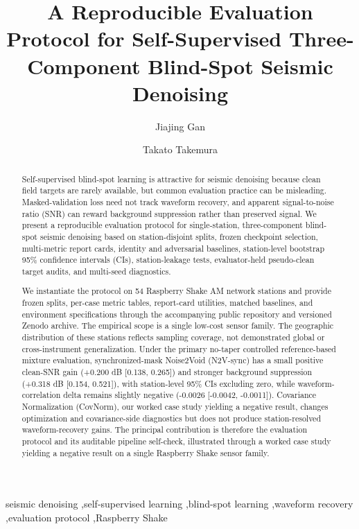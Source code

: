 \documentclass[review,12pt,authoryear]{elsarticle}
\begin{document}
\begin{frontmatter}

\title{A Reproducible Evaluation Protocol for Self-Supervised Three-Component Blind-Spot Seismic Denoising}

\author[aff1]{Jiajing Gan}

\author[aff1]{Takato Takemura}


\address[aff1]{Geomechanics Laboratory, Department of Earth and Environmental Sciences, College of Humanities and Sciences, Nihon University, 3-25-40 Sakurajosui, Setagaya-ku, Tokyo 156-8550, Japan}

\begin{abstract}
Self-supervised blind-spot learning is attractive for seismic denoising because clean field targets are rarely available, but common evaluation practice can be misleading. Masked-validation loss need not track waveform recovery, and apparent signal-to-noise ratio (SNR) can reward background suppression rather than preserved signal. We present a reproducible evaluation protocol for single-station, three-component blind-spot seismic denoising based on station-disjoint splits, frozen checkpoint selection, multi-metric report cards, identity and adversarial baselines, station-level bootstrap 95\% confidence intervals (CIs), station-leakage tests, evaluator-held pseudo-clean target audits, and multi-seed diagnostics.

We instantiate the protocol on 54 Raspberry Shake AM network stations and provide frozen splits, per-case metric tables, report-card utilities, matched baselines, and environment specifications through the accompanying public repository and versioned Zenodo archive. The empirical scope is a single low-cost sensor family. The geographic distribution of these stations reflects sampling coverage, not demonstrated global or cross-instrument generalization. Under the primary no-taper controlled reference-based mixture evaluation, synchronized-mask Noise2Void (N2V-sync) has a small positive clean-SNR gain (+0.200 dB [0.138, 0.265]) and stronger background suppression (+0.318 dB [0.154, 0.521]), with station-level 95\% CIs excluding zero, while waveform-correlation delta remains slightly negative (-0.0026 [-0.0042, -0.0011]). Covariance Normalization (CovNorm), our worked case study yielding a negative result, changes optimization and covariance-side diagnostics but does not produce station-resolved waveform-recovery gains. The principal contribution is therefore the evaluation protocol and its auditable pipeline self-check, illustrated through a worked case study yielding a negative result on a single Raspberry Shake sensor family.

\end{abstract}

\begin{keyword}
seismic denoising \sep self-supervised learning \sep blind-spot learning \sep waveform recovery \sep evaluation protocol \sep Raspberry Shake
\end{keyword}

\end{frontmatter}
\linenumbers
\end{document}
